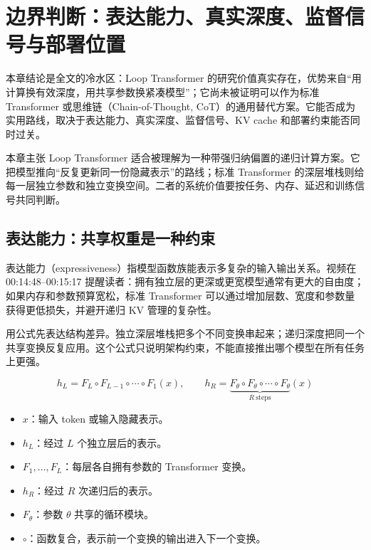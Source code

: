 \section{边界判断：表达能力、真实深度、监督信号与部署位置}
\label{sec:limits-deployment}

本章结论是全文的冷水区：Loop Transformer 的研究价值真实存在，优势来自“用计算换有效深度，用共享参数换紧凑模型”；它尚未被证明可以作为标准 Transformer 或思维链（Chain-of-Thought, CoT）的通用替代方案。它能否成为实用路线，取决于表达能力、真实深度、监督信号、KV cache 和部署约束能否同时过关。

\begin{importantbox}{本章主张}
Loop Transformer 适合被理解为一种带强归纳偏置的递归计算方案。它把模型推向“反复更新同一份隐藏表示”的路线；标准 Transformer 的深层堆栈则给每一层独立参数和独立变换空间。二者的系统价值要按任务、内存、延迟和训练信号共同判断。
\end{importantbox}

\subsection{表达能力：共享权重是一种约束}

表达能力（expressiveness）指模型函数族能表示多复杂的输入输出关系。视频在 00:14:48--00:15:17 提醒读者：拥有独立层的更深或更宽模型通常有更大的自由度；如果内存和参数预算宽松，标准 Transformer 可以通过增加层数、宽度和参数量获得更低损失，并避开递归 KV 管理的复杂性。

用公式先表达结构差异。独立深层堆栈把多个不同变换串起来；递归深度把同一个共享变换反复应用。这个公式只说明架构约束，不能直接推出哪个模型在所有任务上更强。

$$
h_L = F_L\circ F_{L-1}\circ \cdots \circ F_1(x),\qquad
h_R = \underbrace{F_\theta\circ F_\theta\circ \cdots \circ F_\theta}_{R\ \mathrm{steps}}(x)
$$

\begin{itemize}
  \item \(x\)：输入 token 或输入隐藏表示。
  \item \(h_L\)：经过 \(L\) 个独立层后的表示。
  \item \(F_1,\ldots,F_L\)：每层各自拥有参数的 Transformer 变换。
  \item \(h_R\)：经过 \(R\) 次递归后的表示。
  \item \(F_\theta\)：参数 \(\theta\) 共享的循环模块。
  \item \(\circ\)：函数复合，表示前一个变换的输出进入下一个变换。
\end{itemize}

